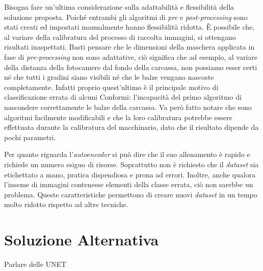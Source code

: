 Bisogna fare un'ultima considerazione sulla adattabilità e flessibilità della soluzione proposta.
Poiché entrambi gli algoritmi di \textit{pre} e \textit{post-processing} sono stati creati ed impostati manualmente hanno flessibilità ridotta.
È possibile che, al variare della calibratura del processo di raccolta immagini, si ottengano risultati inaspettati.
Basti pensare che le dimensioni della maschera applicata in fase di \textit{pre-processing} non sono adattative, ciò significa che ad esempio, al variare della distanza della fotocamere dal fondo della carcassa, non possiamo esser certi né che tutti i gradini siano visibili né che le balze vengano nascoste completamente.
Infatti proprio quest'ultimo è il principale motivo di classificazione errata di alcuni Conformi: l'incapacità del primo algoritmo di nascondere correttamente le balze della carcassa.
Va però fatto notare che sono algoritmi facilmente modificabili e che la loro calibratura potrebbe essere effettuata durante la calibratura del macchinario, dato che il risultato dipende da pochi parametri.

Per quanto riguarda l'\textit{autoencoder} si può dire che il suo allenamento è rapido e richiede un numero esiguo di risorse.
Soprattutto non è richiesto che il \textit{dataset} sia etichettato a mano, pratica dispendiosa e prona ad errori.
Inoltre, anche qualora l'inseme di immagini contenesse elementi della classe errata, ciò non sarebbe un problema.
Queste caratteristiche permettono di creare nuovi \textit{dataset} in un tempo molto ridotto rispetto ad altre tecniche.

\clearpage
\section{Soluzione Alternativa}

Parlare delle UNET

